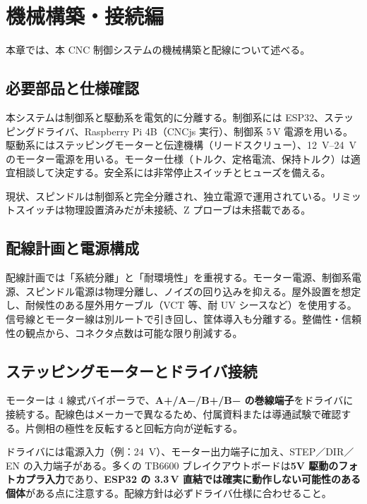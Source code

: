 \documentclass[uplatex,dvipdfmx]{ujarticle}
\begin{document}
\section{機械構築・接続編}

本章では、本 CNC 制御システムの機械構築と配線について述べる。

\subsection{必要部品と仕様確認}

本システムは制御系と駆動系を電気的に分離する。制御系には ESP32、ステッピングドライバ、Raspberry Pi 4B（CNCjs 実行）、制御系 5\,V 電源を用いる。駆動系にはステッピングモーターと伝達機構（リードスクリュー）、\SIrange{12}{24}{\volt} のモーター電源を用いる。モーター仕様（トルク、定格電流、保持トルク）は適宜相談して決定する。安全系には非常停止スイッチとヒューズを備える。

現状、スピンドルは制御系と完全分離され、独立電源で運用されている。リミットスイッチは物理設置済みだが未接続、Z プローブは未搭載である。

\subsection{配線計画と電源構成}

配線計画では「系統分離」と「耐環境性」を重視する。モーター電源、制御系電源、スピンドル電源は物理分離し、ノイズの回り込みを抑える。屋外設置を想定し、耐候性のある屋外用ケーブル（VCT 等、耐 UV シースなど）を使用する。信号線とモーター線は別ルートで引き回し、筐体導入も分離する。整備性・信頼性の観点から、コネクタ点数は可能な限り削減する。

\subsection{ステッピングモーターとドライバ接続}

モーターは 4 線式バイポーラで、\textbf{A+/A−/B+/B− の巻線端子}をドライバに接続する。配線色はメーカーで異なるため、付属資料または導通試験で確認する。片側相の極性を反転すると回転方向が逆転する。

ドライバには電源入力（例：\SI{24}{\volt}）、モーター出力端子に加え、STEP／DIR／EN の入力端子がある。多くの TB6600 \cite{tb6600}ブレイクアウトボードは\textbf{5V 駆動のフォトカプラ入力}であり、\textbf{ESP32 の 3.3\,V 直結では確実に動作しない可能性のある個体}がある点に注意する。配線方針は必ずドライバ仕様に合わせること。
\end{document}
